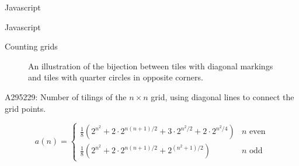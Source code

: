 \documentclass{beamer}%
\begin{document}
\begin{frame}{Javascript} %
\end{frame}

\begin{frame}{Javascript} %
\end{frame}

\begin{frame}{Counting grids} %
  \begin{figure}
    
    \caption{An illustration of the bijection between tiles with diagonal markings and tiles with quarter circles in opposite corners.}
  \end{figure}
\end{frame}

\begin{frame}{A295229: Number of tilings of the $n \times n$ grid, using diagonal lines to connect the grid points.}
  
  \[
    a(n) = \begin{cases}
      \frac 18 (2^{n^2} + 2\cdot2^{n(n+1)/2} + 3\cdot2^{n^2/2} + 2\cdot2^{n^2/4}) & n \text{ even} \\
      \frac 18 (2^{n^2} + 2\cdot2^{n(n+1)/2} + 2^{(n^2+1)/2}) & n \text{ odd}
    \end{cases}
  \]
\end{frame}
\end{document}
